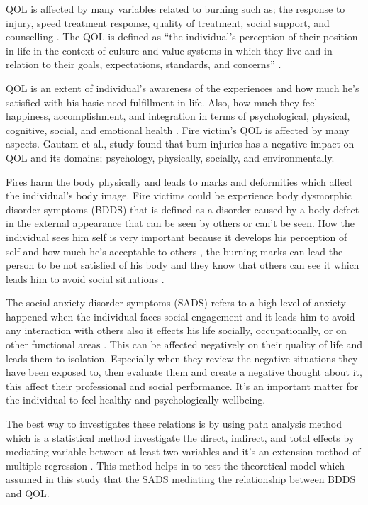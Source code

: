\documentclass[10pt]{NSP1}
\begin{document}
QOL is affected by many variables related to burning such as; the response to injury, speed treatment response, quality of treatment, social support, and counselling . The QOL is defined as “the individual’s perception of their position in life in the context of culture and value systems in which they live and in relation to their goals, expectations, standards, and concerns” .

QOL is an extent of individual’s awareness of the experiences and how much he’s satisfied with his basic need fulfillment in life. Also, how much they feel happiness, accomplishment, and integration in terms of psychological, physical, cognitive, social, and emotional health . Fire victim’s QOL is affected by many aspects. Gautam et al.,  study found that burn injuries has a negative impact on QOL and its domains; psychology, physically, socially, and environmentally.

Fires harm the body physically and leads to marks and deformities which affect the individual’s body image. Fire victims could be experience body dysmorphic disorder symptoms (BDDS) that is defined as a disorder caused by a body defect in the external appearance that can be seen by others or can’t be seen. How the individual sees him self is very important because it develops his perception of self and how much he’s acceptable to others , the burning marks can lead the person to be not satisfied of his body and they know that others can see it which leads him to avoid social situations .

The social anxiety disorder symptoms (SADS) refers to a high level of anxiety happened when the individual faces social engagement and it leads him to avoid any interaction with others also it effects his life socially, occupationally, or on other functional areas . This can be affected negatively on their quality of life and leads them to isolation. Especially when they review the negative situations they have been exposed to, then evaluate them and create a negative thought about it, this affect their professional and social performance. It’s an important matter for the individual to feel healthy and psychologically wellbeing.

The best way to investigates these relations is by using path analysis method which is a statistical method investigate the direct, indirect, and total effects by mediating variable between at least two variables and it’s an extension method of multiple regression . This method helps in to test the theoretical model which assumed in this study that the SADS mediating the relationship between BDDS and QOL.
\end{document}
